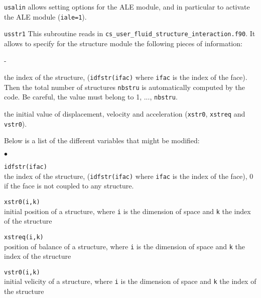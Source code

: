 {{\texttt{usalin} allows setting options for the ALE module, and in
particular to activate the ALE module (\texttt{iale=1}).


\texttt{usstr1} This subroutine reads in \texttt{cs\_user\_fluid\_structure\_interaction.f90}. It allows to specify for the structure module the
following pieces of information:
\begin{list}{-}{}
  \item the index of the structure, (\texttt{idfstr(ifac)} where \texttt{ifac} is the index of the face). Then the total number of structures \texttt{nbstru} is automatically computed by the code. Be careful, the value must belong to 1, ..., \texttt{nbstru}.
  \item the initial value of displacement, velocity and acceleration
    (\texttt{xstr0}, \texttt{xstreq} and \texttt{vstr0}).
\end{list}

Below is a list of the different variables that might be modified:

\begin{list}{$\bullet$}{}

\item{\texttt{idfstr(ifac)}} \\
{the index of the structure, (\texttt{idfstr(ifac)} where \texttt{ifac} is the index of the face), 0 if the face is not coupled to any structure.}

\item{\texttt{xstr0(i,k)}} \\
{initial position of a structure, where \texttt{i} is the dimension of space
and \texttt{k} the index of the structure}

\item{\texttt{xstreq(i,k)}} \\
{position of balance of a structure, where \texttt{i} is the dimension of space
and \texttt{k} the index of the structure}

\item{\texttt{vstr0(i,k)}} \\
{initial velicity of a structure, where \texttt{i} is the dimension of space
and \texttt{k} the index of the structure }
\end{list}

}}
